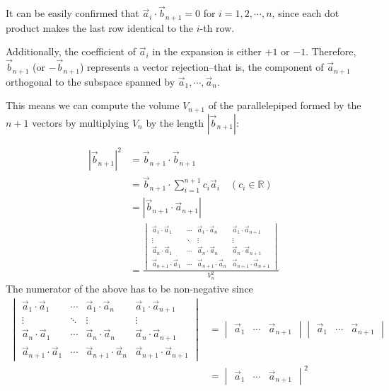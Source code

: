 \documentclass[letterpaper, 12pt]{article}
\theoremstyle{custom}
\begin{document}
It can be easily confirmed that $\vec{a}_i \cdot \vec{b}_{n+1} = 0$ for $i = 1, 2, \cdots, n$, since each dot product makes the last row identical to the $i$-th row.

Additionally, the coefficient of $\vec{a}_i$ in the expansion is either $+1$ or $-1$.
Therefore, $\vec{b}_{n+1}$ (or $-\vec{b}_{n+1}$) represents a vector rejection--that is, the component of $\vec{a}_{n+1}$ orthogonal to the subspace spanned by $\vec{a}_1, \cdots, \vec{a}_n$.

This means we can compute the volume $V_{n+1}$ of the parallelepiped formed by the $n+1$ vectors by multiplying $V_n$ by the length $\left| \vec{b}_{n+1} \right|$:


\begin{align*}
  \left| \vec{b}_{n+1} \right|^2 
  &= \vec{b}_{n+1} \cdot \vec{b}_{n+1}\\
  &= \vec{b}_{n+1} \cdot \sum_{i=1}^{n+1}c_i \vec{a}_{i} \quad (c_i \in \mathbb{R})\\
  &= \left| \vec{b}_{n+1} \cdot \vec{a}_{n+1} \right| \\
  &=  \frac{
    \begin{vmatrix}
      \vec{a}_1 \cdot \vec{a}_1 & \cdots & \vec{a}_1 \cdot \vec{a}_n & \vec{a}_1 \cdot \vec{a}_{n+1} \\
      \vdots & \ddots &  \vdots & \vdots\\
      \vec{a}_n \cdot \vec{a}_1 & \cdots & \vec{a}_n \cdot \vec{a}_n & \vec{a}_n \cdot \vec{a}_{n+1}\\
      \vec{a}_{n+1} \cdot \vec{a}_1 & \cdots & \vec{a}_{n+1} \cdot \vec{a}_n & \vec{a}_{n+1} \cdot \vec{a}_{n+1}
    \end{vmatrix}
  }{V_n^2}
\end{align*}
The numerator of the above has to be non-negative since
\begin{align*}
  \begin{vmatrix}
      \vec{a}_1 \cdot \vec{a}_1 & \cdots & \vec{a}_1 \cdot \vec{a}_n & \vec{a}_1 \cdot \vec{a}_{n+1} \\
      \vdots & \ddots &  \vdots & \vdots\\
      \vec{a}_n \cdot \vec{a}_1 & \cdots & \vec{a}_n \cdot \vec{a}_n & \vec{a}_n \cdot \vec{a}_{n+1}\\
      \vec{a}_{n+1} \cdot \vec{a}_1 & \cdots & \vec{a}_{n+1} \cdot \vec{a}_n & \vec{a}_{n+1} \cdot \vec{a}_{n+1}
    \end{vmatrix}&=
    \begin{vmatrix}
      \vec{a}_1  & \cdots  & \vec{a}_{n+1} 
    \end{vmatrix}
    \begin{vmatrix}
      \vec{a}_1  & \cdots  & \vec{a}_{n+1} 
    \end{vmatrix}\\
    &=
    \begin{vmatrix}
      \vec{a}_1  & \cdots  & \vec{a}_{n+1} 
    \end{vmatrix}^2
\end{align*}
\end{document}
